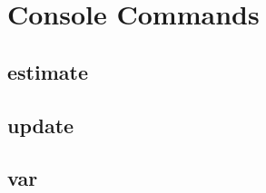 \chapter{Console Commands}
    \label{_ConsoleChapter}

\section{estimate}
    \label{estimate}

\section{update}
    \label{UpdateCommand}

\section{var}
    \label{var}

